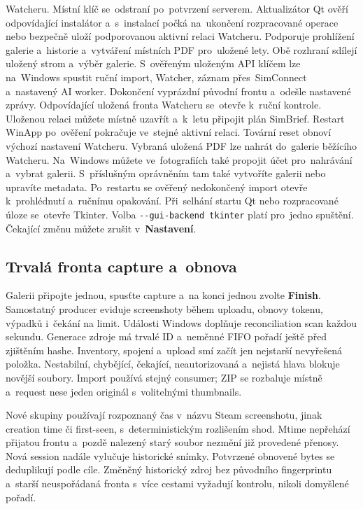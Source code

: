 \documentclass[11pt,a4paper]{article}
\newcommand{\ui}[1]{\textbf{#1}}
\newcommand{\codeword}[1]{\nolinkurl{#1}}
\begin{document}
Watcheru. Místní klíč se~odstraní po~potvrzení serverem.
Aktualizátor Qt ověří odpovídající instalátor a~s~instalací počká na~ukončení
rozpracované operace nebo bezpečně uloží podporovanou aktivní relaci Watcheru.
Podporuje prohlížení galerie a~historie a~vytváření místních PDF
pro~uložené lety. Obě rozhraní sdílejí uložený strom a~výběr galerie.
S~ověřeným uloženým API klíčem
lze na~Windows spustit ruční import, Watcher, záznam přes~SimConnect
a~nastavený AI worker. Dokončení vyprázdní původní frontu a~odešle nastavené
zprávy. Odpovídající uložená fronta Watcheru se~otevře k~ruční kontrole.
Uloženou relaci můžete místně uzavřít a~k~letu připojit plán SimBrief.
Restart WinApp po~ověření pokračuje ve~stejné aktivní relaci.
Tovární reset obnoví výchozí nastavení Watcheru. Vybraná uložená PDF lze
nahrát do~galerie běžícího Watcheru.
Na~Windows můžete ve~fotografiích také propojit účet pro~nahrávání a~vybrat
galerii. S~příslušným oprávněním tam také vytvoříte galerii nebo upravíte metadata.
Po~restartu se
ověřený nedokončený import otevře k~prohlédnutí a~ručnímu opakování.
Při~selhání startu Qt
nebo rozpracované úloze se~otevře Tkinter. Volba \codeword{--gui-backend tkinter} platí pro~jedno
spuštění. Čekající změnu můžete zrušit v~\ui{Nastavení}.

\subsection{Trvalá fronta capture a~obnova}

Galerii připojte jednou, spusťte capture a~na konci jednou zvolte
\ui{Finish}. Samostatný producer eviduje screenshoty během uploadu,
obnovy tokenu, výpadků i~čekání na limit. Události Windows doplňuje
reconciliation scan každou sekundu. Generace zdroje má trvalé ID a~neměnné
FIFO pořadí ještě před zjištěním hashe. Inventory, spojení a~upload smí
začít jen nejstarší nevyřešená položka. Nestabilní, chybějící, čekající,
neautorizovaná a~nejistá hlava blokuje novější soubory. Import používá
stejný consumer; ZIP se rozbaluje místně a~request nese jeden originál
s~volitelnými thumbnails.

Nové skupiny používají rozpoznaný čas v~názvu Steam screenshotu, jinak
creation time či first-seen, s~deterministickým rozlišením shod.
Mtime nepřehází přijatou frontu a~pozdě nalezený starý soubor nezmění již
provedené přenosy. Nová session nadále vylučuje historické snímky.
Potvrzené obnovené bytes se deduplikují podle cíle. Změněný historický
zdroj bez původního fingerprintu a~starší neuspořádaná fronta s~více cestami
vyžadují kontrolu, nikoli domyšlené pořadí.
\end{document}

